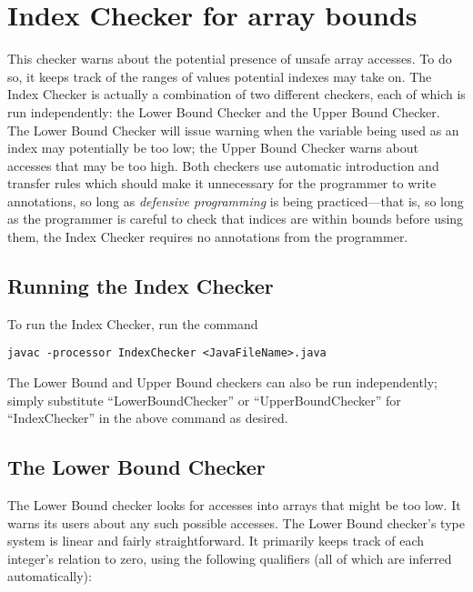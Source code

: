 \chapter{Index Checker for array bounds\label{index-checker}}

This checker warns about the potential presence of unsafe array
accesses.  To do so, it keeps track of the ranges of values potential
indexes may take on.  The Index Checker is actually a combination of
two different checkers, each of which is run independently: the Lower
Bound Checker and the Upper Bound Checker.  The Lower Bound Checker
will issue warning when the variable being used as an index may
potentially be too low; the Upper Bound Checker warns about accesses
that may be too high. Both checkers use automatic introduction and
transfer rules which should make it unnecessary for the programmer to
write annotations, so long as \textit{defensive programming} is being
practiced---that is, so long as the programmer is careful to check
that indices are within bounds before using them, the Index Checker
requires no annotations from the programmer.

\section{Running the Index Checker\label{index-running}}

To run the Index Checker, run the command

\begin{Verbatim}
javac -processor IndexChecker <JavaFileName>.java
\end{Verbatim}

The Lower Bound and Upper Bound checkers can also be run
independently; simply substitute ``LowerBoundChecker'' or
``UpperBoundChecker'' for ``IndexChecker'' in the above command as
desired.

\section{The Lower Bound Checker\label{index-lowerbound}}

The Lower Bound checker looks for accesses into arrays that might be
too low.  It warns its users about any such possible accesses. The
Lower Bound checker's type system is linear and fairly
straightforward. It primarily keeps track of each integer's relation
to zero, using the following qualifiers (all of which are inferred
automatically):


